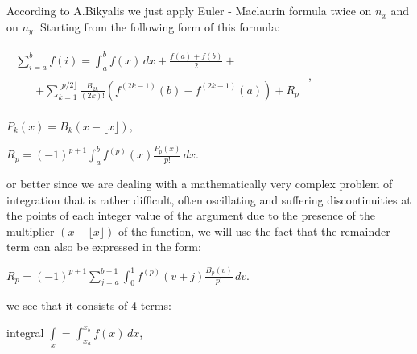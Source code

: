 \documentclass[twoside, 10pt]{article}
\begin{document}
\begin{multicols}{2}

\section*{}\label{eulermaclaurin-2d-formula}
\vspace{-3.5mm}


According to A.Bikyalis \cite{Bikyalis1968} we just apply Euler -
Maclaurin formula twice on \(n_x\) and on \(n_y\). Starting from the following form of this formula:


$\begin{array}{l}
\begin{array}{ll}
\displaystyle \sum _{i=a}^{b}f(i)= \int_{a}^{b}f(x)\,dx+{\frac {f(a)+f(b)}{2}} + & \,\,\,\,
\end{array}  \\
\begin{array}{rr}
\,\,\,\,\,\, & +\sum_{k=1}^{\lfloor p/2\rfloor }{\frac {B_{2k}}{(2k)!}}\left(f^{(2k-1)}(b)-f^{(2k-1)}(a)\right)+R_{p}
\end{array}
\end{array}$,

\({\displaystyle P_{k}(x)=B_{k}\left(x-\lfloor x\rfloor \right),}\)

\({\displaystyle R_{p}=(-1)^{p+1}\int_{a}^{b}f^{(p)}(x){\frac {P_{p}(x)}{p!}}\,dx.}\)

or better since we are dealing with a mathematically very complex
problem of integration that is rather difficult, often oscillating and
suffering discontinuities at the points of each integer value of the
argument due to the presence of the multiplier \((x-\lfloor x\rfloor )\)
of the function, we will use the fact that the remainder term can also
be expressed in the form:

\({\displaystyle R_{p}=(-1)^{p+1}\sum_{j=a}^{b-1} \int _{0}^{1}f^{(p)}(v+j){\frac {B_{p}(v)}{p!}}\,dv.}\)

we see that it consists of 4 terms:

\noindent
integral \(\int\limits_{x}^{}=\int _{x_a}^{x_b}f(x)\,dx\),


\end{multicols}
\end{document}
